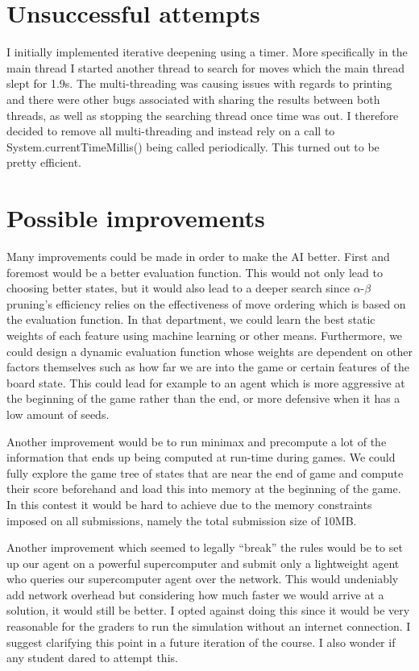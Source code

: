 \documentclass{article}
\begin{document}
\section{Unsuccessful attempts}
I initially implemented iterative deepening using a timer. More specifically in the main thread I started another thread to search for moves which the main thread slept for 1.9s. The multi-threading was causing issues with regards to printing and there were other bugs associated with sharing the results between both threads, as well as stopping the searching thread once time was out. I therefore decided to remove all multi-threading and instead rely on a call to System.currentTimeMillis() being called periodically. This turned out to be pretty efficient.

\section{Possible improvements}
Many improvements could be made in order to make the AI better. First and foremost would be a better evaluation function. This would not only lead to choosing better states, but it would also lead to a deeper search since $\alpha$-$\beta$ pruning's efficiency relies on the effectiveness of move ordering which is based on the evaluation function. In that department, we could learn the best static weights of each feature using  machine learning or other means. Furthermore, we could design a dynamic evaluation function whose weights are dependent on other factors themselves such as how far we are into the game or certain features of the board state. This could lead for example to an agent which is more aggressive at the beginning of the game rather than the end, or more defensive when it has a low amount of seeds.

Another improvement would be to run minimax and precompute a lot of the information that ends up being computed at run-time during games. We could fully explore the game tree of states that are near the end of game and compute their score beforehand and load this into memory at the beginning of the game. In this contest it would be hard to achieve due to the memory constraints imposed on all submissions, namely the total submission size of 10MB.

Another improvement which seemed to legally ``break'' the rules would be to set up our agent on a powerful supercomputer and submit only a lightweight agent who queries our supercomputer agent over the network. This would undeniably add network overhead but considering how much faster we would arrive at a solution, it would still be better. I opted against doing this since it would be very reasonable for the graders to run the simulation without an internet connection. I suggest clarifying this point in a future iteration of the course. I also wonder if any student dared to attempt this.
\end{document}
